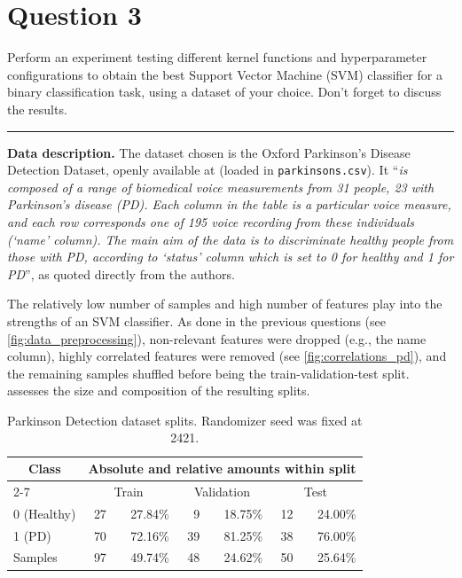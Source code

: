 \section{Question 3}
Perform an experiment testing different kernel functions and hyperparameter configurations 
to obtain the best Support Vector Machine (SVM) classifier for a binary classification task, using a dataset of your choice. 
Don't forget to discuss the results.

\noindent\rule{\textwidth}{.5pt}

\noindent\textbf{Data description.}
The dataset chosen is the Oxford Parkinson's Disease Detection Dataset, 
openly available at \cite{parkinsons_174} (loaded in \texttt{parkinsons.csv}).
It 
``{\itshape is composed of a range of biomedical voice measurements from 31 people, 23 with Parkinson's disease (PD). 
Each column in the table is a particular voice measure, 
and each row corresponds one of 195 voice recording from these individuals (`name' column). 
The main aim of the data is to discriminate healthy people from those with PD, 
according to `status' column which is set to 0 for healthy and 1 for PD}'',
as quoted directly from the authors.

The relatively low number of samples and high number of features play into the strengths of an SVM classifier.
As done in the previous questions (see \cref{fig:data_preprocessing}), 
non-relevant features were dropped (e.g., the name column), 
highly correlated features were removed (see \cref{fig:correlations_pd}),
and the remaining samples shuffled before being the train-validation-test split.
%
 assesses the size and composition of the resulting splits.

\begin{table}[!hb]
    \centering
    \caption{
        Parkinson Detection dataset splits. 
        Randomizer seed was fixed at 2421.
    }
    \label{tab:data_pd}
    \begin{tabular}{l rr rr rr}
        \toprule
        \multicolumn{1}{c}{\multirow{2}{*}{Class}} & 
        \multicolumn{6}{c}{Absolute and relative amounts within split} \\ 
        \cmidrule{2-7}
        & \multicolumn{2}{c}{Train}
        & \multicolumn{2}{c}{Validation}
        & \multicolumn{2}{c}{Test} \\ 
        \midrule
        0 (Healthy) & 27 & 27.84\% & 9 & 18.75\% & 12 & 24.00\% \\
        1 (PD) & 70 & 72.16\% & 39 & 81.25\% & 38 & 76.00\% \\ 
        \midrule 
        Samples & 97 & 49.74\% & 48 & 24.62\% & 50 & 25.64\% \\ 
        \bottomrule
    \end{tabular}
\end{table}

